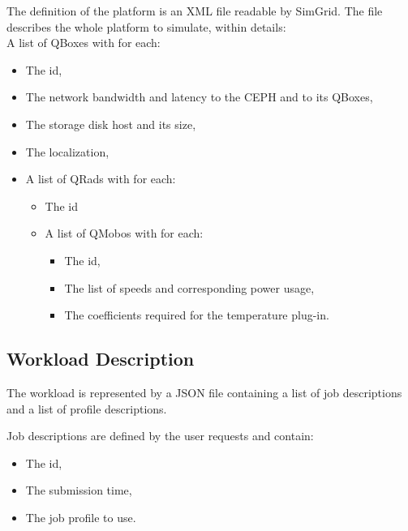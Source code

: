 
The definition of the platform is an XML file readable by SimGrid.
The file describes the whole platform to simulate, within details: \\

A list of QBoxes with for each: 
\begin{itemize}
    \item The id, 
    \item The network bandwidth and latency to the CEPH and to its QBoxes, 
    \item The storage disk host and its size, 
    \item The localization,
    \item A list of QRads with for each: 
    \begin{itemize}
        \item The id 
        \item A list of QMobos with for each: 
        \begin{itemize}
            \item The id, 
            \item The list of speeds and corresponding power usage, 
            \item The coefficients required for the temperature plug-in.
        \end{itemize}
    \end{itemize}
\end{itemize}

\subsection{Workload Description} %
\label{subsec:workload}

The workload is represented by a JSON file containing a list of job descriptions and a list of profile descriptions.

Job descriptions are defined by the user requests and contain: 
\begin{itemize}
    \item The id, 
    \item The submission time,
    \item The job profile to use.
\end{itemize}

